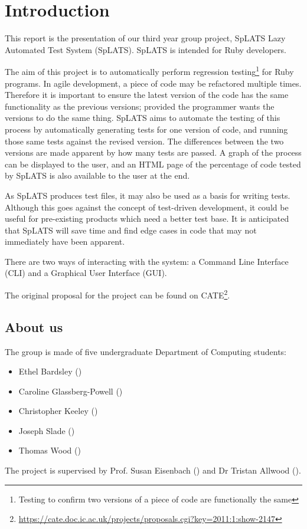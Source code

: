 \chapter{Introduction}

This report is the presentation of our third year group project, SpLATS Lazy Automated Test System (SpLATS). SpLATS is intended for Ruby developers.

The aim of this project is to automatically perform regression testing\footnote{Testing to confirm two versions of a piece of code are functionally the same} for Ruby programs. In agile development, a piece of code may be refactored multiple times. Therefore it is important to ensure the latest version of the code has the same functionality as the previous versions; provided the programmer wants the versions to do the same thing. SpLATS aims to automate the testing of this process by automatically generating tests for one version of code, and running those same tests against the revised version. The differences between the two versions are made apparent by how many tests are passed. A graph of the process can be displayed to the user, and an HTML page of the percentage of code tested by SpLATS is also available to the user at the end.

As SpLATS produces test files, it may also be used as a basis for writing tests. Although this goes against the concept of test-driven development, it could be useful for pre-existing products which need a better test base. It is anticipated that SpLATS will save time and find edge cases in code that may not immediately have been apparent.

There are two ways of interacting with the system: a Command Line Interface (CLI) and a Graphical User Interface (GUI).

The original proposal for the project can be found on CATE\footnote{\url{https://cate.doc.ic.ac.uk/projects/proposals.cgi?key=2011:1:show-2147}}.

\section{About us}
  The group is made of five undergraduate Department of Computing students:
  \begin{itemize}
    \item{Ethel Bardsley ()}
    \item{Caroline Glassberg-Powell ()}
    \item{Christopher Keeley ()}
    \item{Joseph Slade ()}
    \item{Thomas Wood ()}
  \end{itemize}

  The project is supervised by Prof. Susan Eisenbach () and Dr Tristan Allwood ().
